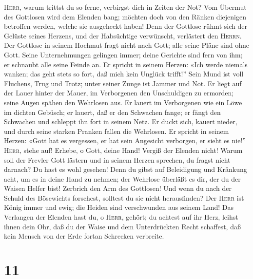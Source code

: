  \textsc{Herr}, warum trittst du so ferne, verbirgst dich
in Zeiten der Not?  Vom Übermut des Gottlosen wird dem
Elenden bang; möchten doch von den Ränken diejenigen betroffen werden,
welche sie ausgeheckt haben!  Denn der Gottlose rühmt sich
der Gelüste seines Herzens, und der Habsüchtige verwünscht, verlästert
den \textsc{Herrn}.  Der Gottlose in seinem Hochmut fragt
nicht nach Gott; alle seine Pläne sind ohne Gott.  Seine
Unternehmungen gelingen immer; deine Gerichte sind fern von ihm; er
schnaubt alle seine Feinde an.  Er spricht in seinem
Herzen: «Ich werde niemals wanken; das geht stets so fort, daß mich kein
Unglück trifft!''  Sein Mund ist voll Fluchens, Trug und
Trotz; unter seiner Zunge ist Jammer und Not.  Er liegt
auf der Lauer hinter der Mauer, im Verborgenen den Unschuldigen zu
ermorden; seine Augen spähen den Wehrlosen aus.  Er lauert
im Verborgenen wie ein Löwe im dichten Gebüsch; er lauert, daß er den
Schwachen fange; er fängt den Schwachen und schleppt ihn fort in seinem
Netz.  Er duckt sich, kauert nieder, und durch seine
starken Pranken fallen die Wehrlosen.  Er spricht in
seinem Herzen: «Gott hat es vergessen, er hat sein Angesicht verborgen,
er sieht es nie!''  \textsc{Herr}, stehe auf! Erhebe, o
Gott, deine Hand! Vergiß der Elenden nicht!  Warum soll
der Frevler Gott lästern und in seinem Herzen sprechen, du fragst nicht
darnach?  Du hast es wohl gesehen! Denn du gibst auf
Beleidigung und Kränkung acht, um es in deine Hand zu nehmen; der
Wehrlose überläßt es dir, der du der Waisen Helfer bist! 
Zerbrich den Arm des Gottlosen! Und wenn du nach der Schuld des
Bösewichts forschest, solltest du sie nicht herausfinden?
 Der \textsc{Herr} ist König immer und ewig; die Heiden
sind verschwunden aus seinem Land!  Das Verlangen der
Elenden hast du, o \textsc{Herr}, gehört; du achtest auf ihr Herz,
leihst ihnen dein Ohr,  daß du der Waise und dem
Unterdrückten Recht schaffest, daß kein Mensch von der Erde fortan
Schrecken verbreite.

\hypertarget{section-10}{%
\section{11}\label{section-10}}

